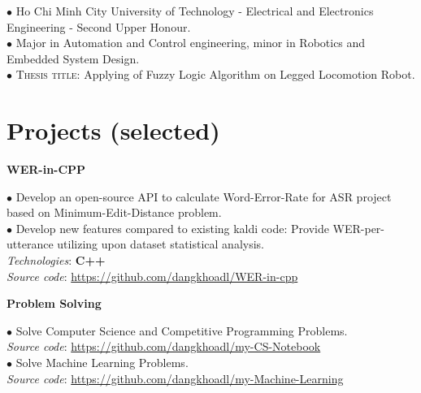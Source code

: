 \documentclass[10pt]{article}
\begin{document}
        \vspace{-5mm}

        $\bullet$ {Ho Chi Minh City University of Technology - Electrical and Electronics Engineering - Second Upper Honour.} \\
        $\bullet$ {Major in Automation and Control engineering, minor in Robotics and Embedded System Design.} \\
        $\bullet$ \textsc{Thesis title}: Applying of Fuzzy Logic Algorithm on Legged Locomotion Robot.


    \section{Projects (selected)}
        \begin{center}
            \textbf{WER-in-CPP}
        \end{center}
        $\bullet$ Develop an open-source API to calculate Word-Error-Rate for ASR project based on Minimum-Edit-Distance problem. \\
        $\bullet$ Develop new features compared to existing kaldi code: Provide WER-per-utterance utilizing upon dataset statistical analysis. \\    
            \emph{Technologies}: \textbf{C++} \\
            \emph{Source code}: \href{https://github.com/dangkhoadl/WER-in-cpp}{https://github.com/dangkhoadl/WER-in-cpp}

        \begin{center}
            \textbf{Problem Solving}
        \end{center}
        $\bullet$ Solve Computer Science and Competitive Programming Problems. \\
        	\emph{Source code}: \href{https://github.com/dangkhoadl/my-CS-Notebook}{https://github.com/dangkhoadl/my-CS-Notebook} \\
        $\bullet$ Solve Machine Learning Problems. \\
        	\emph{Source code}: \href{https://github.com/dangkhoadl/my-Machine-Learning}{https://github.com/dangkhoadl/my-Machine-Learning}
\end{document}
